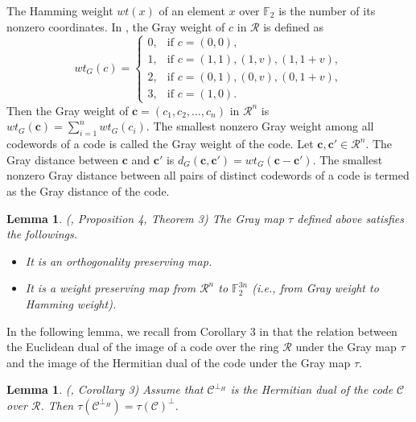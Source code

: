 \documentclass[pdflatex,sn-mathphys-num]{sn-jnl}%
\theoremstyle{thmstyleone}%
\newtheorem{lemma}[theorem]{Lemma}
\theoremstyle{thmstyletwo}%
\theoremstyle{thmstylethree}%
\begin{document}
The Hamming weight $wt(x)$ of an element $x$ over $\mathbb{F}_2$ is the number of its nonzero coordinates. In \cite{F2ring}, the Gray weight of $c$ in $\mathcal{R}$ is defined as
\begin{equation*}
wt_G(c) =
\begin{cases}
0, & \text{if } c = (0,0), \\
1, & \text{if } c = (1,1), (1,v), (1,1+v), \\
2, & \text{if } c = (0,1), (0,v), (0,1+v), \\
3, & \text{if } c = (1,0).
\end{cases}
\end{equation*}
Then the Gray weight of $\mathbf{c}=(c_1,c_2,\dots ,c_n)$ in $\mathcal{R}^n$ is $wt_G(\mathbf{c})=\sum_{i=1}^{n}wt_G(c_i)$. The smallest nonzero Gray weight among all codewords of a code is called the Gray weight
of the code. Let $\mathbf{c},\mathbf{c}'\in\mathcal{R}^n$. The Gray
distance between $\mathbf{c}$ and $\mathbf{c}'$ is $d_G(\mathbf{c},\mathbf{c}')=wt_G(\mathbf{c}-\mathbf{c}')$. The smallest nonzero Gray distance between all pairs of distinct
codewords of a code is termed as the
Gray distance of the code.

\begin{lemma} (\cite{F2ring}, Proposition 4, Theorem 3)
\label{graymap} The Gray map $\tau$ defined above satisfies the followings.

\begin{itemize}
\item[(i)] It is an orthogonality preserving map.
\item[(ii)] It is a weight preserving map from $\mathcal{R}^n$ to $\mathbb{F}_{2}^{3n}$ (i.e., from Gray weight to Hamming weight).
\end{itemize}
\end{lemma}

In the following lemma, we recall from Corollary 3 in \cite{F2ring} that the relation between the Euclidean dual of the image of a code over the ring $\mathcal{R}$ under the Gray map $\tau$ and the image of the Hermitian dual of the code under the Gray map $\tau$.

\begin{lemma} (\cite{F2ring}, Corollary 3)
\label{hull} Assume that $\mathcal{C}^{\perp _{H}}$ is the Hermitian dual of
the code $\mathcal{C}$ over $\mathcal{R}$. Then $\tau (\mathcal{C}^{\perp
_{H}})=\tau (\mathcal{C})^{\perp }$.
\end{lemma}
\end{document}
